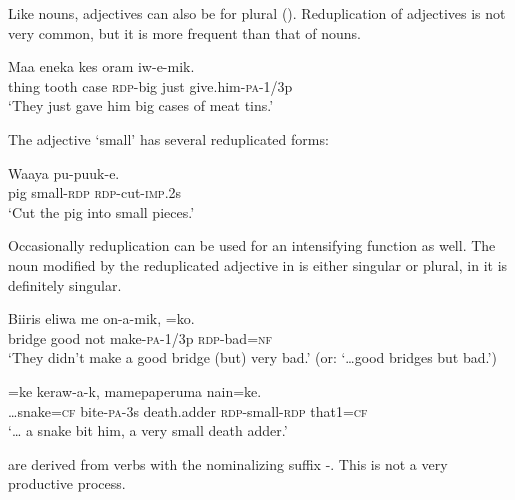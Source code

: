 Like nouns, adjectives can also be  for plural (). Reduplication of adjectives is not very common, but it is more frequent than that of nouns. 

\ea%
\label{ex:3:x85}
\gll Maa eneka kes  oram iw-e-mik. \\
thing tooth case \textsc{rdp}-big just give.him-\textsc{pa}-1/3p\\
\glt`They just gave him big cases of meat tins.'
\z

The adjective  `small' has several reduplicated forms: \textstyleEmphasizedVernacularWords{,} \textstyleEmphasizedVernacularWords{,}  

\ea%
\label{ex:3:x486}
\gll Waaya  pu-puuk-e. \\
pig small-\textsc{rdp} \textsc{rdp}-cut-\textsc{imp}.2s\\
\glt`Cut the pig into small pieces.'
\z

Occasionally reduplication can be used for an intensifying function as well. The noun modified by the reduplicated adjective in  is either singular or plural, in  it is definitely singular.

\ea%
\label{ex:3:x485}
\gll Biiris eliwa me on-a-mik, =ko. \\
bridge good not make-\textsc{pa}-1/3p \textsc{rdp}-bad=\textsc{nf}\\
\glt`They didn't make a good bridge (but) very bad.' (or: `{\dots}good bridges but bad.')
\z

\ea%
\label{ex:3:x86}
=ke keraw-a-k, mamepaperuma  nain=ke. \\
{\dots}snake=\textsc{cf} bite-\textsc{pa}-3s death.adder \textsc{rdp}-small-\textsc{rdp} that1=\textsc{cf}\\
\glt`{\dots} a snake bit him, a very small death adder.'
\z

 are derived from verbs with the nominalizing suffix \nobreakdash-. This is not a very productive process.

